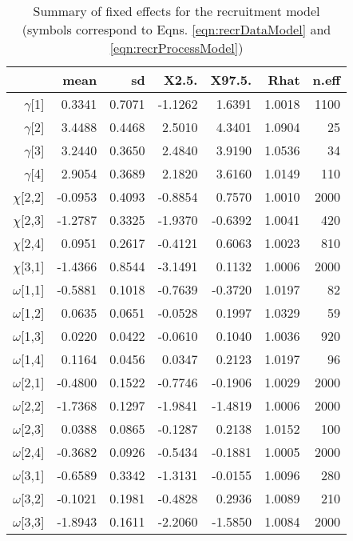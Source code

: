\documentclass[11pt]{article}
\begin{document}
\begin{table}[ht]
\centering
\caption{Summary of fixed effects for the recruitment model (symbols correspond to Eqns. \ref{eqn:recrDataModel} and \ref{eqn:recrProcessModel})} 
\label{table:recruitment}
\begin{tabular}{rrrrrrr}
  \hline
 & mean & sd & X2.5. & X97.5. & Rhat & n.eff \\ 
  \hline
 $\gamma$[1] & 0.3341 & 0.7071 & -1.1262 & 1.6391 & 1.0018 &  1100 \\ 
  $\gamma$[2] & 3.4488 & 0.4468 & 2.5010 & 4.3401 & 1.0904 &    25 \\ 
  $\gamma$[3] & 3.2440 & 0.3650 & 2.4840 & 3.9190 & 1.0536 &    34 \\ 
 $\gamma$[4] & 2.9054 & 0.3689 & 2.1820 & 3.6160 & 1.0149 &   110 \\ 
  $\chi$[2,2] & -0.0953 & 0.4093 & -0.8854 & 0.7570 & 1.0010 &  2000 \\ 
 $\chi$[2,3] & -1.2787 & 0.3325 & -1.9370 & -0.6392 & 1.0041 &   420 \\ 
   $\chi$[2,4] & 0.0951 & 0.2617 & -0.4121 & 0.6063 & 1.0023 &   810 \\ 
  $\chi$[3,1] & -1.4366 & 0.8544 & -3.1491 & 0.1132 & 1.0006 &  2000 \\ 
  $\omega$[1,1] & -0.5881 & 0.1018 & -0.7639 & -0.3720 & 1.0197 &    82 \\ 
  $\omega$[1,2] & 0.0635 & 0.0651 & -0.0528 & 0.1997 & 1.0329 &    59 \\ 
  $\omega$[1,3] & 0.0220 & 0.0422 & -0.0610 & 0.1040 & 1.0036 &   920 \\ 
  $\omega$[1,4] & 0.1164 & 0.0456 & 0.0347 & 0.2123 & 1.0197 &    96 \\ 
  $\omega$[2,1] & -0.4800 & 0.1522 & -0.7746 & -0.1906 & 1.0029 &  2000 \\ 
  $\omega$[2,2] & -1.7368 & 0.1297 & -1.9841 & -1.4819 & 1.0006 &  2000 \\ 
  $\omega$[2,3] & 0.0388 & 0.0865 & -0.1287 & 0.2138 & 1.0152 &   100 \\ 
  $\omega$[2,4] & -0.3682 & 0.0926 & -0.5434 & -0.1881 & 1.0005 &  2000 \\ 
  $\omega$[3,1] & -0.6589 & 0.3342 & -1.3131 & -0.0155 & 1.0096 &   280 \\ 
  $\omega$[3,2] & -0.1021 & 0.1981 & -0.4828 & 0.2936 & 1.0089 &   210 \\ 
  $\omega$[3,3] & -1.8943 & 0.1611 & -2.2060 & -1.5850 & 1.0084 &  2000 \\ 

\end{tabular}
\end{table}
\end{document}
